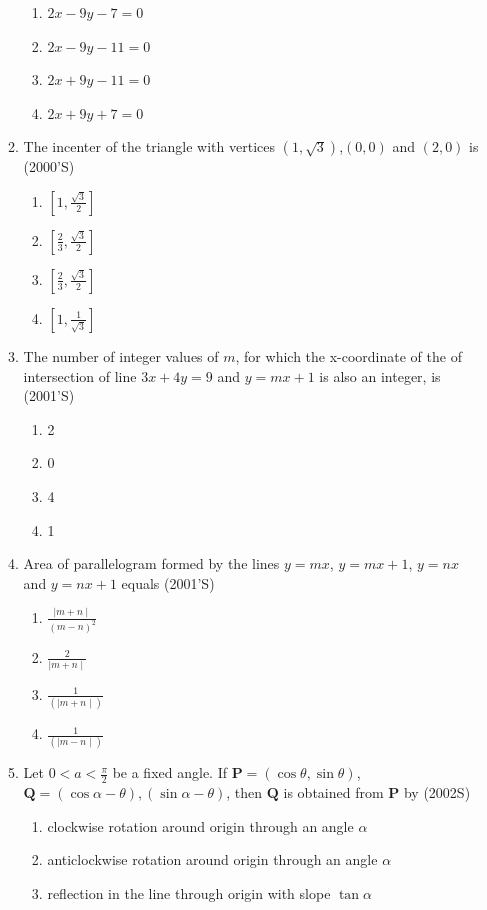 \documentclass[12pt]{article}
\providecommand{\sbrak}[1]{\ensuremath{{}\left[#1\right]}}
\let\vec\mathbf
\begin{document}
\begin{enumerate}
\begin{enumerate}
\begin{enumerate}
\item $2x-9y-7=0$ 
\item $2x-9y-11=0$ 
\item $2x+9y-11=0$
\item $2x+9y+7=0$
\end{enumerate}
\item The incenter of the triangle with vertices $(1,\sqrt{3})$,$(0,0)$ and $(2,0)$ is (2000'S)
\begin{enumerate}
\item $\sbrak{1,\frac{\sqrt{3}}{2}}$ 
\item $\sbrak{\frac{2}{3},\frac{\sqrt{3}}{2}}$ 
\item $\sbrak{\frac{2}{3},\frac{\sqrt{3}}{2}}$ 
\item $\sbrak{1,\frac{1}{{\sqrt{3}}}}$
\end{enumerate}
\item The number of integer values of $m$, for which the x-coordinate of the of intersection of line $3x+4y=9$ and $y=mx+1$ is also an integer, is (2001'S)
\begin{enumerate}
\item 2 
\item 0 
\item 4   
\item 1
\end{enumerate}
\item Area of parallelogram formed by the lines $y=mx$, $y=mx+1$, $y=nx$ and $y=nx+1$ equals (2001'S)
\begin{enumerate}
\item $\frac{\mid m+n\mid}{(m-n)^2}$
\item $\frac{2}{\mid m+n \mid}$
\item $\frac{1}{(\mid m+n \mid)}$
\item $\frac{1}{(\mid m-n\mid)}$
\end{enumerate}
\item Let $0<a<\frac{\pi}{2}$ be a fixed angle. If $\vec{P}=(\cos\theta,\sin\theta)$, $\vec{Q}=(\cos\alpha-\theta),(\sin\alpha-\theta)$, then $\vec{Q}$ is obtained from $\vec{P}$ by (2002S)
\begin{enumerate}
\item clockwise rotation around origin through an angle $\alpha$
\item anticlockwise rotation around origin through an angle $\alpha$
\item reflection in the line through origin with slope $\tan\alpha$

\end{enumerate}
\end{enumerate}
\end{enumerate}
\end{document}
